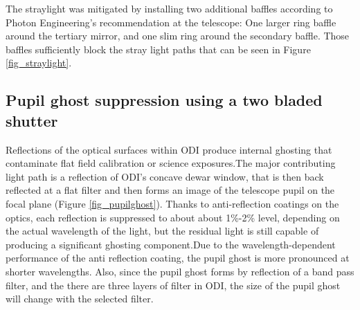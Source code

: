 \documentclass[]{spieman}
\begin{document}
The straylight was mitigated by installing two additional baffles according to
Photon Engineering's recommendation  at the telescope: One larger ring baffle
around the tertiary mirror, and one slim ring around the secondary baffle. Those
baffles sufficiently block the stray light paths that can be seen in Figure
\ref{fig_straylight}.


\subsection{Pupil ghost suppression using a two bladed shutter}

Reflections of the optical surfaces within ODI produce internal ghosting that
contaminate flat field calibration or science exposures.The major contributing
light path is a reflection of ODI’s concave dewar window, that is then back
reflected at a flat filter and then forms an image of the telescope pupil on the
focal plane (Figure \ref{fig_pupilghost}).  Thanks to anti-reflection coatings
on the optics, each reflection is suppressed to about about 1\%-2\% level,
depending on the actual wavelength of the light, but the residual light is still
capable of producing a significant ghosting component.Due to the
wavelength-dependent performance of the anti reflection coating, the pupil ghost
is more pronounced at shorter wavelengths. Also, since the pupil ghost forms by
reflection of a band pass filter, and the there are three layers of filter in
ODI, the size of the pupil ghost will change with the selected filter.
\end{document}
